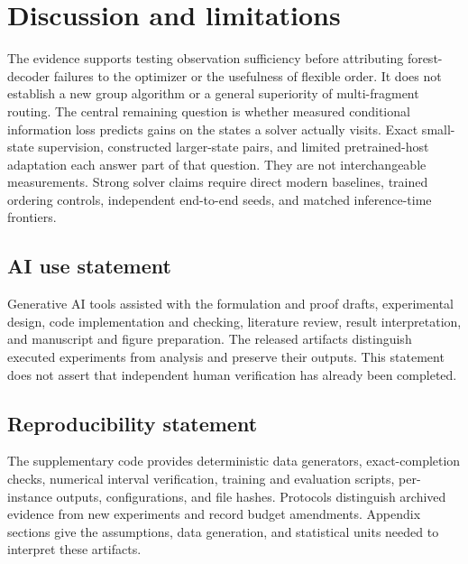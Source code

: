 \documentclass{article}
\begin{document}
\section{Discussion and limitations}
The evidence supports testing observation sufficiency before attributing
forest-decoder failures to the optimizer or the usefulness of flexible order.
It does not establish a new group algorithm or a general superiority of
multi-fragment routing. The central remaining question is whether measured
conditional information loss predicts gains on the states a solver actually
visits. Exact small-state supervision, constructed larger-state pairs, and
limited pretrained-host adaptation each answer part of that question.
They are not interchangeable measurements. Strong solver claims require
direct modern baselines, trained ordering controls, independent end-to-end
seeds, and matched inference-time frontiers.

\subsection*{AI use statement}
Generative AI tools assisted with the formulation and proof drafts, experimental
design, code implementation and checking, literature review, result interpretation,
and manuscript and figure preparation. The released artifacts distinguish
executed experiments from analysis and preserve their outputs. This statement
does not assert that independent human verification has already been completed.

\subsection*{Reproducibility statement}
The supplementary code provides deterministic data generators, exact-completion
checks, numerical interval verification, training and evaluation scripts,
per-instance outputs, configurations, and file hashes. Protocols distinguish
archived evidence from new experiments and record budget amendments. Appendix
sections give the assumptions, data generation, and statistical units needed
to interpret these artifacts.



\appendix

\end{document}
